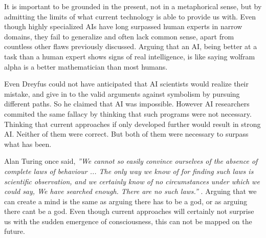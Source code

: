 It is important to be grounded in the present, not in a metaphorical sense, but by admitting the limits of what current technology is able to provide us with. Even though highly specialized AIs have long surpassed human experts in narrow domains, they fail to generalize and often lack common sense, apart from countless other flaws previously discussed. Arguing that an AI, being better at a task than a human expert shows signs of real intelligence, is like saying wolfram alpha is a better mathematician than most humans.

Even Dreyfus could not have anticipated that AI scientists would realize their mistake, and give in to the valid arguments against symbolism by pursuing different paths. So he claimed that AI was impossible. However AI researchers commited the same fallacy by thinking that such programs were not necessary. Thinking that current approaches if only developed further would result in strong AI. Neither of them were correct. But both of them were necessary to surpass what has been.

Alan Turing once said, \textit{''We cannot so easily convince ourselves of the absence of complete laws of behaviour ... The only way we know of for finding such laws is scientific observation, and we certainly know of no circumstances under which we could say, We have searched enough. There are no such laws.''} . Arguing that we can create a mind is the same as arguing there has to be a god, or as arguing there cant be a god. Even though current approaches will certainly not surprise us with the sudden emergence of consciousness, this can not be mapped on the future.